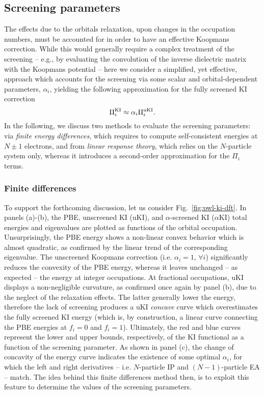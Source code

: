 \subsection{Screening parameters\label{sec:screening-parameters}}
The effects due to the orbitals relaxation, upon changes in the occupation numbers, must be accounted for in order to have an effective Koopmans correction. While this would generally require a complex treatment of the screening -- e.g., by evaluating the convolution of the inverse dielectric matrix with the Koopmans potential -- here we consider a simplified, yet effective, approach which accounts for the screening via some scalar and orbital-dependent parameters, $\alpha_i$, yielding the following approximation for the fully screened KI correction
%
\begin{equation}
    \Pi_i^{\rm KI} \approx \alpha_i \Pi_i^{\rm uKI} .
    \label{eq:approx-screened-ki}
\end{equation}
%
In the following, we discuss two methods to evaluate the screening parameters: via \emph{finite energy differences}, which requires to compute self-consistent energies at $N \pm 1$ electrons, and from \emph{linear response theory}, which relies on the $N$-particle system only, whereas it introduces a second-order approximation for the $\Pi_i$ terms.

\subsubsection*{Finite differences}
To support the forthcoming discussion, let us consider Fig.~\ref{fig:pwl-ki-dft}. In panels (a)-(b), the PBE, unscreened KI (uKI), and $\alpha$-screened KI ($\alpha$KI) total energies and eigenvalues are plotted as functions of the orbital occupation. Unsurprisingly, the PBE energy shows a non-linear convex behavior which is almost quadratic, as confirmed by the linear trend of the corresponding eigenvalue. The unscreened Koopmans correction (i.e. $\alpha_i=1$, $\forall i$) significantly reduces the convexity of the PBE energy, whereas it leaves unchanged -- as expected -- the energy at integer occupations. At fractional occupations, uKI displays a non-negligible curvature, as confirmed once again by panel (b), due to the neglect of the relaxation effects. The latter generally lower the energy, therefore the lack of screening produces a uKI \emph{concave} curve which overestimates the fully screened KI energy (which is, by construction, a linear curve connecting the PBE energies at $f_i=0$ and $f_i=1$). Ultimately, the red and blue curves represent the lower and upper bounds, respectively, of the KI functional as a function of the screening parameter. As shown in panel (c), the change of concavity of the energy curve indicates the existence of some optimal $\alpha_i$, for which the left and right derivatives -- i.e. $N$-particle IP and $(N-1)$-particle EA -- match. The idea behind this finite differences method then, is to exploit this feature to determine the values of the screening parameters.

